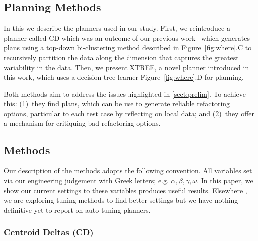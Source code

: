 \documentclass{sig-alternate}
\newcommand{\tion}[1]{\textsection\ref{sect:#1}}
\newcommand{\fig}[1]{Figure~\ref{fig:#1}}
\begin{document}
{\begin{itemize}[leftmargin=3mm]

  
\section{Planning Methods}\label{sect:planners}
 
In this we describe the planners used in our study. First, we reintroduce a planner called CD which was an outcome of our previous work~\cite{me12c} which generates plans using a top-down bi-clustering method described in \fig{where}.C to recursively partition the data along the dimension that captures the greatest variability in the data. Then, we present XTREE, a novel planner introduced in this work, which uses a decision tree learner \fig{where}.D for planning.


Both methods aim to address the issues highlighted in \tion{prelim}. To achieve this: (1)~they find plans, which can be use to generate reliable refactoring options, particular to each test case by reflecting on local data; and (2)~they offer a mechanism for critiquing bad refactoring options.


\subsection{  Methods}

Our  description of the methods adopts the following convention. All variables set via  our engineering judgement  with Greek letters; e.g. $\alpha,\beta,\gamma,\omega$. In this paper, we show our current settings to these variables produces useful results. Elsewhere \cite{krall14,fu:ase15}, we are exploring tuning methods to find better settings but  we have nothing definitive yet to report on auto-tuning planners.

\subsubsection{Centroid Deltas (CD)}



\end{itemize}}
\end{document}
